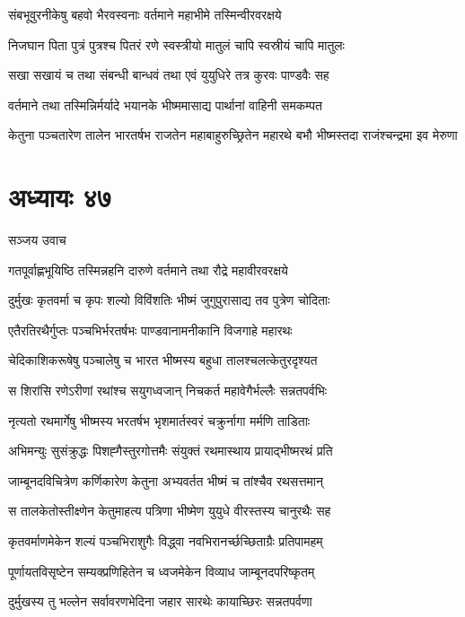 \twolineshloka
{संबभूवुरनीकेषु बहवो भैरवस्वनाः}
{वर्तमाने महाभीमे तस्मिन्वीरवरक्षये}


\twolineshloka
{निजघान पिता पुत्रं पुत्रश्च पितरं रणे}
{स्वस्त्रीयो मातुलं चापि स्वस्रीयं चापि मातुलः}


\twolineshloka
{सखा सखायं च तथा संबन्धी बान्धवं तथा}
{एवं युयुधिरे तत्र कुरवः पाण्डवैः सह}


\twolineshloka
{वर्तमाने तथा तस्मिन्निर्मर्यादे भयानके}
{भीष्ममासाद्य पार्थानां वाहिनी समकम्पत}


\threelineshloka
{केतुना पञ्चतारेण तालेन भारतर्षभ}
{राजतेन महाबाहुरुच्छ्रितेन महारथे}
{बभौ भीष्मस्तदा राजंश्चन्द्रमा इव मेरुणा}


\chapter{अध्यायः ४७}
\twolineshloka
{सञ्जय उवाच}
{}


\twolineshloka
{गतपूर्वाह्णभूयिष्ठि तस्मिन्नहनि दारुणे}
{वर्तमाने तथा रौद्रे महावीरवरक्षये}


\twolineshloka
{दुर्मुखः कृतवर्मा च कृपः शल्यो विविंशतिः}
{भीष्मं जुगुपुरासाद्य तव पुत्रेण चोदिताः}


\twolineshloka
{एतैरतिरथैर्गुप्तः पञ्चभिर्भरतर्षभः}
{पाण्डवानामनीकानि विजगाहे महारथः}


\twolineshloka
{चेदिकाशिकरूषेषु पञ्चालेषु च भारत}
{भीष्मस्य बहुधा तालश्चलत्केतुरदृश्यत}


\twolineshloka
{स शिरांसि रणेऽरीणां रथांश्च सयुगध्वजान्}
{निचकर्त महावेगैर्भल्लैः सन्नतपर्वभिः}


\twolineshloka
{नृत्यतो रथमार्गेषु भीष्मस्य भरतर्षभ}
{भृशमार्तस्वरं चक्रुर्नागा मर्मणि ताडिताः}


\twolineshloka
{अभिमन्युः सुसंक्रुद्धः पिशह्गैस्तुरगोत्तमैः}
{संयुक्तं रथमास्थाय प्रायाद्भीष्मरथं प्रति}


\twolineshloka
{जाम्बूनदविचित्रेण कर्णिकारेण केतुना}
{अभ्यवर्तत भीष्मं च तांश्चैव रथसत्तमान्}


\twolineshloka
{स तालकेतोस्तीक्ष्णेन केतुमाहत्य पत्रिणा}
{भीष्मेण युयुधे वीरस्तस्य चानुरथैः सह}


\twolineshloka
{कृतवर्माणमेकेन शल्यं पञ्चभिराशुगैः}
{विद्ध्वा नवभिरानर्च्छच्छिताग्रैः प्रतिपामहम्}


\twolineshloka
{पूर्णायतविसृष्टेन सम्यक्प्रणिहितेन च}
{ध्वजमेकेन विव्याध जाम्बूनदपरिष्कृतम्}


\twolineshloka
{दुर्मुखस्य तु भल्लेन सर्वावरणभेदिना}
{जहार सारथेः कायाच्छिरः सन्नतपर्वणा}


